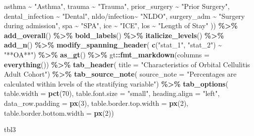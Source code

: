 \documentclass[
]{article}
\newenvironment{Shaded}{\begin{snugshade}}{\end{snugshade}}
\newcommand{\AttributeTok}[1]{\textcolor[rgb]{0.13,0.29,0.53}{#1}}
\newcommand{\DecValTok}[1]{\textcolor[rgb]{0.00,0.00,0.81}{#1}}
\newcommand{\FunctionTok}[1]{\textcolor[rgb]{0.13,0.29,0.53}{\textbf{#1}}}
\newcommand{\NormalTok}[1]{#1}
\newcommand{\SpecialCharTok}[1]{\textcolor[rgb]{0.81,0.36,0.00}{\textbf{#1}}}
\newcommand{\StringTok}[1]{\textcolor[rgb]{0.31,0.60,0.02}{#1}}
\begin{document}
\begin{Shaded}
\begin{Highlighting}[]
\NormalTok{      asthma }\SpecialCharTok{\textasciitilde{}} \StringTok{"Asthma"}\NormalTok{,}
\NormalTok{      trauma }\SpecialCharTok{\textasciitilde{}} \StringTok{"Trauma"}\NormalTok{,}
\NormalTok{      prior\_surgery }\SpecialCharTok{\textasciitilde{}} \StringTok{"Prior Surgery"}\NormalTok{,}
\NormalTok{      dental\_infection }\SpecialCharTok{\textasciitilde{}} \StringTok{"Dental"}\NormalTok{,}
      \StringTok{\textasciigrave{}}\AttributeTok{nldo/infection}\StringTok{\textasciigrave{}}\SpecialCharTok{\textasciitilde{}} \StringTok{"NLDO"}\NormalTok{,}
\NormalTok{      surgery\_adm }\SpecialCharTok{\textasciitilde{}} \StringTok{"Surgery during admission"}\NormalTok{,}
\NormalTok{      spa }\SpecialCharTok{\textasciitilde{}} \StringTok{"SPA"}\NormalTok{,}
\NormalTok{      ice }\SpecialCharTok{\textasciitilde{}} \StringTok{"ICE"}\NormalTok{,}
\NormalTok{      los }\SpecialCharTok{\textasciitilde{}} \StringTok{"Length of Stay"}
\NormalTok{      )) }\SpecialCharTok{\%\textgreater{}\%}
  \FunctionTok{add\_overall}\NormalTok{() }\SpecialCharTok{\%\textgreater{}\%} \FunctionTok{bold\_labels}\NormalTok{() }\SpecialCharTok{\%\textgreater{}\%} \FunctionTok{italicize\_levels}\NormalTok{() }\SpecialCharTok{\%\textgreater{}\%} \FunctionTok{add\_n}\NormalTok{() }\SpecialCharTok{\%\textgreater{}\%}
  \FunctionTok{modify\_spanning\_header}\NormalTok{(}
    \FunctionTok{c}\NormalTok{(}\StringTok{"stat\_1"}\NormalTok{, }\StringTok{"stat\_2"}\NormalTok{) }\SpecialCharTok{\textasciitilde{}} \StringTok{"**OA**"}\NormalTok{) }\SpecialCharTok{\%\textgreater{}\%}
  \FunctionTok{as\_gt}\NormalTok{() }\SpecialCharTok{\%\textgreater{}\%}
\NormalTok{  gt}\SpecialCharTok{::}\FunctionTok{fmt\_markdown}\NormalTok{(}\AttributeTok{columns =} \FunctionTok{everything}\NormalTok{()) }\SpecialCharTok{\%\textgreater{}\%}
  \FunctionTok{tab\_header}\NormalTok{(}
    \AttributeTok{title =} \StringTok{"Characteristics of Orbital Cellulitis Adult Cohort"}\NormalTok{) }\SpecialCharTok{\%\textgreater{}\%} 
    \FunctionTok{tab\_source\_note}\NormalTok{(}
    \AttributeTok{source\_note =} \StringTok{"Percentages are calculated within levels of the stratifying }
\StringTok{    variable"}\NormalTok{) }\SpecialCharTok{\%\textgreater{}\%}
  \FunctionTok{tab\_options}\NormalTok{(}
    \AttributeTok{table.width =} \FunctionTok{pct}\NormalTok{(}\DecValTok{70}\NormalTok{),}
    \AttributeTok{table.font.size =} \StringTok{"small"}\NormalTok{,}
    \AttributeTok{heading.align =} \StringTok{"left"}\NormalTok{,}
    \AttributeTok{data\_row.padding =} \FunctionTok{px}\NormalTok{(}\DecValTok{3}\NormalTok{),}
    \AttributeTok{table.border.top.width =} \FunctionTok{px}\NormalTok{(}\DecValTok{2}\NormalTok{),}
    \AttributeTok{table.border.bottom.width =} \FunctionTok{px}\NormalTok{(}\DecValTok{2}\NormalTok{))}

\NormalTok{tbl3}
\end{Highlighting}
\end{Shaded}
\end{document}
